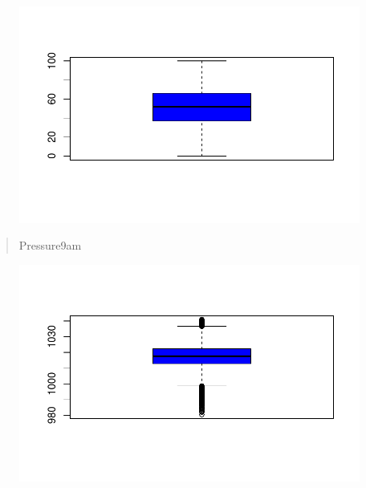 \documentclass[
  letterpaper,
  DIV=11,
  numbers=noendperiod]{scrartcl}
\newenvironment{Shaded}{\begin{snugshade}}{\end{snugshade}}
\newcommand{\AttributeTok}[1]{\textcolor[rgb]{0.40,0.45,0.13}{#1}}
\newcommand{\FunctionTok}[1]{\textcolor[rgb]{0.28,0.35,0.67}{#1}}
\newcommand{\NormalTok}[1]{\textcolor[rgb]{0.00,0.23,0.31}{#1}}
\newcommand{\SpecialCharTok}[1]{\textcolor[rgb]{0.37,0.37,0.37}{#1}}
\newcommand{\StringTok}[1]{\textcolor[rgb]{0.13,0.47,0.30}{#1}}
\begin{document}
\begin{figure}[H]

{\centering \includegraphics{RainAus_EDA_files/figure-pdf/unnamed-chunk-19-1.pdf}

}

\end{figure}

\begin{quote}
Pressure9am
\end{quote}

\begin{Shaded}
\end{Shaded}

\begin{figure}[H]

{\centering \includegraphics{RainAus_EDA_files/figure-pdf/unnamed-chunk-20-1.pdf}

}

\end{figure}
\end{document}

